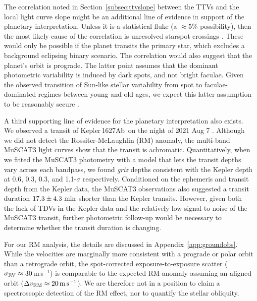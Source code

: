 \documentclass[12pt,modern,twocolumn,tighten,linenumbers]{aastex63}
\newcommand{\pn}{Kepler\,1627Ab} %
\newcommand{\ms}{\,m\,s$^{-1}$}
\begin{document}
The correlation noted in Section~\ref{subsec:ttvslope} between the
TTVs and the local light curve slope might be an additional line of evidence
in support of the planetary interpretation.  Unless it is a
statistical fluke (a $\approx$5\% possibility), then the most likely
cause of the correlation is unresolved starspot
crossings \citep{mazeh_time_2015}.  These would only be possible if the
planet transits the primary star, which excludes a background
eclipsing binary scenario.  The correlation would also suggest that the planet's
orbit is prograde.  The latter point assumes that the dominant
photometric variability is induced by dark spots, and not bright
faculae.  Given the observed transition of Sun-like stellar
variability from spot to faculae-dominated regimes between young and
old ages, we expect this latter assumption to be reasonably secure
\citep{shapiro_are_2016,montet_long-term_2017,reinhold_stellar_2020}.


A third supporting line of evidence for the planetary interpretation
also exists.  We observed a transit of \pn\ on the
night of 2021 Aug 7 .    Although we did not detect the
Rossiter-McLaughlin (RM) anomaly, the multi-band MuSCAT3 light curves
show that the transit is achromatic.
Quantitatively, when we fitted the MuSCAT3
photometry with a model that lets the transit depths vary across each
bandpass, we found {\it griz} depths consistent with the Kepler depth
at 0.6, 0.3, 0.3, and 1.1-$\sigma$ respectively.    Conditioned on the
ephemeris and transit depth from the Kepler data, the MuSCAT3 observations also
suggested a transit duration $17.3\pm4.3\ {\rm min}$ shorter than the
Kepler transits.
However, given both the lack of TDVs in the Kepler data
and the relatively low signal-to-noise of the MuSCAT3 transit,
further photometric follow-up would be necessary to determine
whether the transit duration is  changing.  

For our RM analysis,
the details are discussed in Appendix~\ref{app:groundobs}.  While the
velocities are marginally more consistent with a prograde or polar
orbit than a retrograde orbit, the spot-corrected exposure-to-exposure
scatter ($\sigma_{\rm RV}\approx 30$\ms) is comparable to the expected
RM anomaly assuming an aligned orbit ($\Delta v_{\rm RM}\approx
20\,{\rm m\,s}^{-1}$).  We are therefore not in a position to claim a
spectroscopic detection of the RM effect, nor to quantify the stellar
obliquity.
\end{document}
